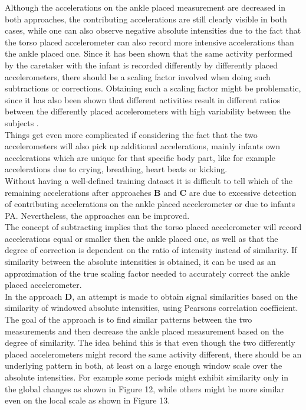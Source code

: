 \documentclass{article}
\begin{document}
{\newpage
Although the accelerations on the ankle placed measurement are decreased in both approaches, the contributing accelerations are still clearly visible in both cases, while one can also observe negative absolute intensities due to the fact that the torso placed accelerometer can also record more intensive accelerations than the ankle placed one. Since it has been shown that the same activity performed by the caretaker with the infant is recorded differently by differently placed accelerometers, there should be a scaling factor involved when doing such subtractions or corrections. Obtaining such a scaling factor might be problematic, since it has also been shown that different activities result in different ratios between the differently placed accelerometers with high variability between the subjects \cite{ref5}.\\Things get even more complicated if considering the fact that the two accelerometers will also pick up additional accelerations, mainly infants own accelerations which are unique for that specific body part, like for example accelerations due to crying, breathing, heart beats or kicking.\\Without having a well-defined training dataset it is difficult to tell which of the remaining accelerations after approaches \textbf{B} and \textbf{C} are due to excessive detection of contributing accelerations on the ankle placed accelerometer or due to infants PA. Nevertheless, the approaches can be improved.\\The concept of subtracting implies that the torso placed accelerometer will record accelerations equal or smaller then the ankle placed one, as well as that the degree of correction is dependent on the ratio of intensity instead of similarity. If similarity between the absolute intensities is obtained, it can be used as an approximation of the true scaling factor needed to accurately correct the ankle placed accelerometer. \\
In the approach \textbf{D}, an attempt is made to obtain signal similarities based on the similarity of windowed absolute intensities, using Pearsons correlation coefficient. The goal of the approach is to find similar patterns between the two measurements and then decrease the ankle placed measurement based on the degree of similarity. The idea behind this is that even though the two differently placed accelerometers might record the same activity different, there should be an underlying pattern in both, at least on a large enough window scale over the absolute intensities. For example some periods might exhibit similarity only in the global changes as shown in Figure 12, while others might be more similar even on the local scale as shown in Figure 13.
}
\end{document}
